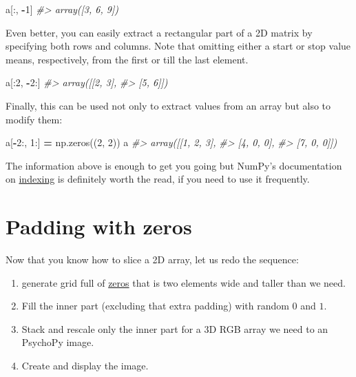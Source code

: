 \documentclass[
]{book}
\newenvironment{Shaded}{\begin{snugshade}}{\end{snugshade}}
\newcommand{\CommentTok}[1]{\textcolor[rgb]{0.56,0.35,0.01}{\textit{#1}}}
\newcommand{\DecValTok}[1]{\textcolor[rgb]{0.00,0.00,0.81}{#1}}
\newcommand{\NormalTok}[1]{#1}
\newcommand{\OperatorTok}[1]{\textcolor[rgb]{0.81,0.36,0.00}{\textbf{#1}}}
\providecommand{\tightlist}{%
  \setlength{\itemsep}{0pt}\setlength{\parskip}{0pt}}
\begin{document}
\begin{Shaded}
\begin{Highlighting}[]
\NormalTok{a[:, }\OperatorTok{{-}}\DecValTok{1}\NormalTok{]}
\CommentTok{\#\textgreater{} array([3, 6, 9])}
\end{Highlighting}
\end{Shaded}

Even better, you can easily extract a rectangular part of a 2D matrix by specifying both rows and columns. Note that omitting either a start or stop value means, respectively, from the first or till the last element.

\begin{Shaded}
\begin{Highlighting}[]
\NormalTok{a[:}\DecValTok{2}\NormalTok{, }\OperatorTok{{-}}\DecValTok{2}\NormalTok{:]}
\CommentTok{\#\textgreater{} array([[2, 3],}
\CommentTok{\#\textgreater{}        [5, 6]])}
\end{Highlighting}
\end{Shaded}

Finally, this can be used not only to extract values from an array but also to modify them:

\begin{Shaded}
\begin{Highlighting}[]
\NormalTok{a[}\OperatorTok{{-}}\DecValTok{2}\NormalTok{:, }\DecValTok{1}\NormalTok{:] }\OperatorTok{=}\NormalTok{ np.zeros((}\DecValTok{2}\NormalTok{, }\DecValTok{2}\NormalTok{))}
\NormalTok{a}
\CommentTok{\#\textgreater{} array([[1, 2, 3],}
\CommentTok{\#\textgreater{}        [4, 0, 0],}
\CommentTok{\#\textgreater{}        [7, 0, 0]])}
\end{Highlighting}
\end{Shaded}

The information above is enough to get you going but NumPy's documentation on \href{https://numpy.org/doc/stable/user/basics.indexing.html}{indexing} is definitely worth the read, if you need to use it frequently.

\hypertarget{padding-with-zeros}{%
\section{Padding with zeros}\label{padding-with-zeros}}

Now that you know how to slice a 2D array, let us redo the sequence:

\begin{enumerate}
\def\labelenumi{\arabic{enumi}.}
\tightlist
\item
  generate grid full of \href{https://numpy.org/doc/stable/reference/generated/numpy.zeros.html?highlight=zeros\#numpy.zeros}{zeros} that is two elements wide and taller than we need.
\item
  Fill the inner part (excluding that extra padding) with random \(0\) and \(1\).
\item
  Stack and rescale only the inner part for a 3D RGB array we need to an PsychoPy image.
\item
  Create and display the image.
\end{enumerate}
\end{document}
